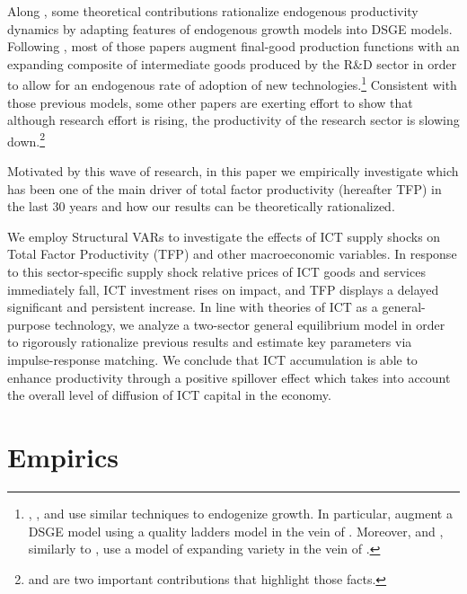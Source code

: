 \documentclass[14pt]{article}
\begin{document}
Along \cite{comin2006medium}, some theoretical contributions rationalize endogenous productivity dynamics by adapting features of endogenous growth models into DSGE models. Following \cite{romer1990endogenous}, most of those papers augment final-good production functions with an expanding composite of intermediate goods produced by the R\&D sector in order to allow for an endogenous rate of adoption of new technologies.\footnote{\cite{bianchi2014growth}, \cite{anzoategui2016endogenous}, and \cite{moran2017innovation} use similar techniques to endogenize growth. In particular, \cite{bianchi2014growth} augment a DSGE  model using a quality ladders model in the vein of \cite{grossman1991quality}. Moreover, \cite{anzoategui2016endogenous} and \cite{moran2017innovation}, similarly to \cite{comin2006medium}, use a model of expanding variety in the vein of \cite{romer1990endogenous}.} Consistent with those previous models, some other papers are exerting effort to show that although research effort is rising, the productivity of the research sector is slowing down.\footnote{\cite{jones2009burden} and \cite{bloom2017ideas} are two important contributions that highlight those facts.}

Motivated by this wave of research, in this paper we empirically investigate which has been one of the main driver of total factor productivity (hereafter TFP) in the last 30 years and how our results can be theoretically rationalized.

We employ Structural VARs to investigate the effects of ICT supply shocks on Total Factor Productivity (TFP) and other macroeconomic variables. In response to this sector-specific supply shock relative prices of ICT goods and services immediately fall, ICT investment rises on impact, and TFP displays a delayed significant and persistent increase. In line with theories of ICT as a general-purpose technology, we analyze a two-sector general equilibrium model in order to rigorously rationalize previous results and estimate key parameters via impulse-response matching. We conclude that ICT accumulation is able to enhance productivity through a positive spillover effect which takes into account the overall level of diffusion of ICT capital in the economy.





\section{Empirics}
\end{document}
